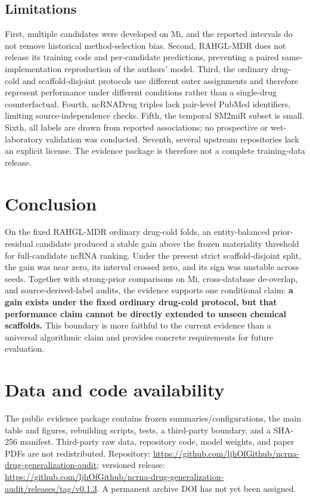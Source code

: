 \documentclass[10pt]{article}
\begin{document}
\subsection{Limitations}

First, multiple candidates were developed on Mi, and the reported intervals do not remove historical method-selection bias. Second, RAHGL-MDR does not release its training code and per-candidate predictions, preventing a paired same-implementation reproduction of the authors' model. Third, the ordinary drug-cold and scaffold-disjoint protocols use different outer assignments and therefore represent performance under different conditions rather than a single-drug counterfactual. Fourth, ncRNADrug triples lack pair-level PubMed identifiers, limiting source-independence checks. Fifth, the temporal SM2miR subset is small. Sixth, all labels are drawn from reported associations; no prospective or wet-laboratory validation was conducted. Seventh, several upstream repositories lack an explicit license. The evidence package is therefore not a complete training-data release.

\section{Conclusion}

On the fixed RAHGL-MDR ordinary drug-cold folds, an entity-balanced prior-residual candidate produced a stable gain above the frozen materiality threshold for full-candidate ncRNA ranking. Under the present strict scaffold-disjoint split, the gain was near zero, its interval crossed zero, and its sign was unstable across seeds. Together with strong-prior comparisons on Mi, cross-database de-overlap, and source-derived-label audits, the evidence supports one conditional claim: \textbf{a gain exists under the fixed ordinary drug-cold protocol, but that performance claim cannot be directly extended to unseen chemical scaffolds.} This boundary is more faithful to the current evidence than a universal algorithmic claim and provides concrete requirements for future evaluation.

\section*{Data and code availability}

The public evidence package contains frozen summaries/configurations, the main table and figures, rebuilding scripts, tests, a third-party boundary, and a SHA-256 manifest. Third-party raw data, repository code, model weights, and paper PDFs are not redistributed. Repository: \url{https://github.com/ljhOfGithub/ncrna-drug-generalization-audit}; versioned release: \url{https://github.com/ljhOfGithub/ncrna-drug-generalization-audit/releases/tag/v0.1.3}. A permanent archive DOI has not yet been assigned.
\end{document}
